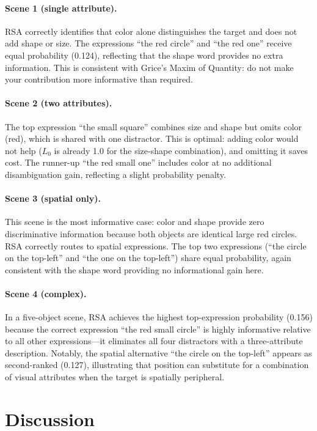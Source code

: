 \documentclass[10pt]{article}
\begin{document}
\paragraph{Scene 1 (single attribute).} RSA correctly identifies that color alone distinguishes the target and does not add shape or size. The expressions ``the red circle'' and ``the red one'' receive equal probability (0.124), reflecting that the shape word provides no extra information. This is consistent with Grice's Maxim of Quantity: do not make your contribution more informative than required.

\paragraph{Scene 2 (two attributes).} The top expression ``the small square'' combines size and shape but omits color (red), which is shared with one distractor. This is optimal: adding color would not help ($L_0$ is already 1.0 for the size-shape combination), and omitting it saves cost. The runner-up ``the red small one'' includes color at no additional disambiguation gain, reflecting a slight probability penalty.

\paragraph{Scene 3 (spatial only).} This scene is the most informative case: color and shape provide zero discriminative information because both objects are identical large red circles. RSA correctly routes to spatial expressions. The top two expressions (``the circle on the top-left'' and ``the one on the top-left'') share equal probability, again consistent with the shape word providing no informational gain here.

\paragraph{Scene 4 (complex).} In a five-object scene, RSA achieves the highest top-expression probability (0.156) because the correct expression ``the red small circle'' is highly informative relative to all other expressions---it eliminates all four distractors with a three-attribute description. Notably, the spatial alternative ``the circle on the top-left'' appears as second-ranked (0.127), illustrating that position can substitute for a combination of visual attributes when the target is spatially peripheral.

\section{Discussion}
\end{document}
